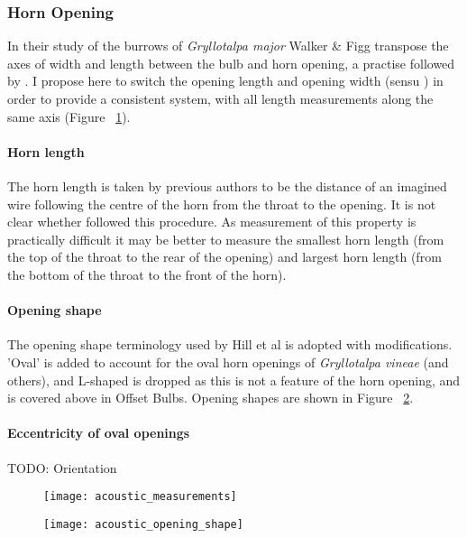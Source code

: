 \documentclass{article}
\begin{document}
   \subsubsection{Horn Opening}
   In their study of the burrows of \textit{Gryllotalpa major} Walker \& Figg \cite{walker1990} transpose the axes of width and length between the bulb and horn opening, a practise followed by \cite{jafari2015}. I propose here to switch the opening length and opening width (sensu \cite{walker1990}) in order to provide a consistent system, with all length measurements along the same axis (Figure ~\ref{fig:acoustic_measurements}).
   \paragraph{Horn length}
   The horn length is taken  by previous authors to be the distance of an imagined wire following the centre of the horn from the throat to the opening. It is not clear whether \cite{jafari2015} followed this procedure. As measurement of this property is practically difficult it may be better to measure the smallest horn length (from the top of the throat to the rear of the opening) and largest horn length (from the bottom of the throat to the front of the horn).
   \paragraph{Opening shape}
   The opening shape terminology used by Hill et al \cite{hill2006} is adopted with modifications. 'Oval' is added to account for the oval horn openings of \textit{Gryllotalpa vineae} (and others), and L-shaped is dropped as this is not a feature of the horn opening, and is covered above in Offset Bulbs. Opening shapes are shown in Figure ~\ref{fig:acoustic_opening_shape}.
   \paragraph{Eccentricity of oval openings}
   TODO: Orientation
   \begin{figure}[h]
   	\texttt{[image: acoustic\_measurements]}
   	\caption{}
   	\label{fig:acoustic_measurements}
   \end{figure}
   
   \begin{figure}[h]
   	\texttt{[image: acoustic\_opening\_shape]}
   	\caption{}
   	\label{fig:acoustic_opening_shape}
   \end{figure}
   
\end{document}
